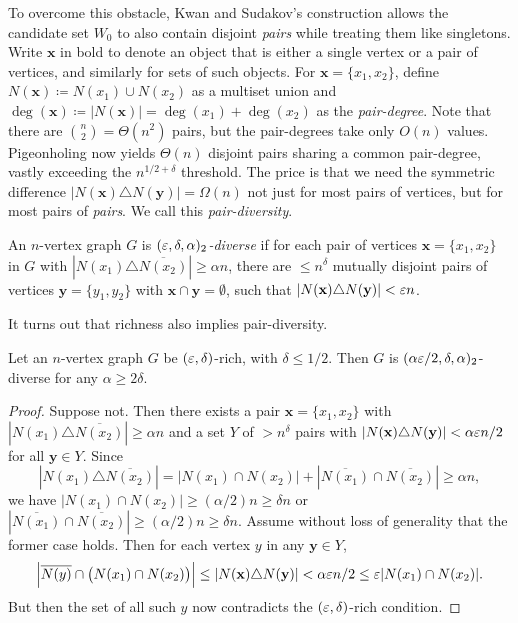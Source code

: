 To overcome this obstacle, Kwan and Sudakov's construction allows the candidate set $W_0$ to also contain disjoint \textit{pairs} while treating them like singletons. Write $\mathbf{x}$ in bold to denote an object that is either a single vertex or a pair of vertices, and similarly for sets of such objects. For $\mathbf{x} = \{x_1, x_2\}$, define $N(\mathbf{x}) \coloneqq N(x_1) \cup N(x_2)$ as a multiset union and $\deg(\mathbf{x}) \coloneqq |N(\mathbf{x})| = \deg(x_1) + \deg(x_2)$ as the \textit{pair-degree}. Note that there are $\binom{n}{2} = \Theta(n^2)$ pairs, but the pair-degrees take only $O(n)$ values. Pigeonholing now yields $\Theta(n)$ disjoint pairs sharing a common pair-degree, vastly exceeding the $n^{1/2 + \delta}$ threshold. The price is that we need the symmetric difference $|N(\mathbf{x}) \triangle N(\mathbf{y})| = \Omega(n)$ not just for most pairs of vertices, but for most pairs of \emph{pairs}. We call this \textit{pair-diversity}.

\begin{definition}\label{def:pair_diverse}
  An $n$-vertex graph $G$ is \textit{$(\varepsilon, \delta, \alpha)_2$-diverse} if for each pair of vertices $\mathbf{x} = \{x_1, x_2\}$ in $G$ with $|N(x_1) \triangle \overline{N(x_2)}| \geq \alpha n$, there are $\leq n^{\delta}$ mutually disjoint pairs of vertices $\mathbf{y} = \{y_1, y_2\}$ with $\mathbf{x} \cap \mathbf{y} = \emptyset$, such that $|N(\mathbf{x}) \triangle N(\mathbf{y})| < \varepsilon n$.
\end{definition}

It turns out that richness also implies pair-diversity.

\begin{lemma}
  \label{lem:richness-implies-pair-diversity}
  Let an $n$-vertex graph $G$ be $(\varepsilon, \delta)$-rich, with $\delta \leq 1/2$. Then $G$ is $(\alpha\varepsilon/2, \delta, \alpha)_2$-diverse for any $\alpha \geq 2\delta$.
\end{lemma}

\begin{proof}
  Suppose not. Then there exists a pair $\mathbf{x} = \{x_1, x_2\}$ with $|N(x_1) \triangle \overline{N(x_2)}| \geq \alpha n$ and a set $Y$ of $> n^{\delta}$ pairs with $|N(\mathbf{x}) \triangle N(\mathbf{y})| < \alpha \varepsilon n /2$ for all $\mathbf{y} \in Y$. Since
  \[
    |N(x_1) \triangle \overline{N(x_2)}| = |N(x_1) \cap N(x_2)|  + |\overline{N(x_1)} \cap \overline{N(x_2)}| \geq \alpha n,
  \]
  we have $|N(x_1) \cap N(x_2)| \geq (\alpha/2)n \geq \delta n$ or $|\overline{N(x_1)} \cap \overline{N(x_2)}| \geq (\alpha/2)n \geq \delta n$. Assume without loss of generality that the former case holds. Then for each vertex $y$ in any $\mathbf{y} \in Y$, 
  \[
    \left|\overline{N(y)} \cap \bigl(N(x_1) \cap N(x_2)\bigr)\right| \leq |N(\mathbf{x}) \triangle N(\mathbf{y})| < \alpha \varepsilon n /2 \leq \varepsilon |N(x_1) \cap N(x_2)|.
  \]
  But then the set of all such $y$ now contradicts the $(\varepsilon, \delta)$-rich condition.
\end{proof}

